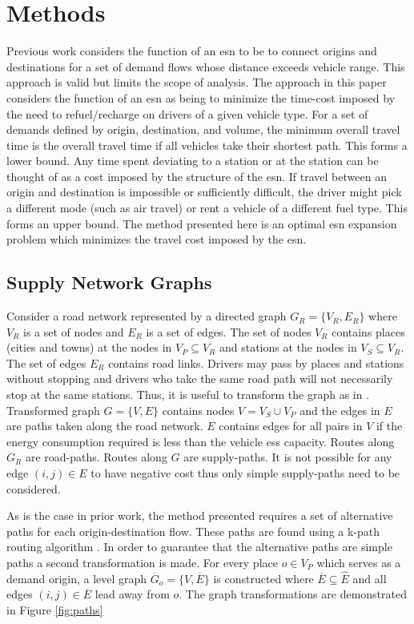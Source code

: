 \section{Methods}

Previous work considers the function of an \gls{esn} to be to connect origins and destinations for a set of demand flows whose distance exceeds vehicle range. This approach is valid but limits the scope of analysis. The approach in this paper considers the function of an \gls{esn} as being to minimize the time-cost imposed by the need to refuel/recharge on drivers of a given vehicle type. For a set of demands defined by origin, destination, and volume, the minimum overall travel time is the overall travel time if all vehicles take their shortest path. This forms a lower bound. Any time spent deviating to a station or at the station can be thought of as a cost imposed by the structure of the \gls{esn}. If travel between an origin and destination is impossible or sufficiently difficult, the driver might pick a different mode (such as air travel) or rent a vehicle of a different fuel type. This forms an upper bound. The method presented here is an optimal \gls{esn} expansion problem which minimizes the travel cost imposed by the \gls{esn}.

\subsection{Supply Network Graphs}

Consider a road network represented by a directed graph $G_R = \{V_R, E_R\}$ where $V_R$ is a set of nodes and $E_R$ is a set of edges. The set of nodes $V_R$ contains places (cities and towns) at the nodes in $V_{P} \subseteq V_R$ and stations at the nodes in $V_{S} \subseteq V_R$. The set of edges $E_R$ contains road links. Drivers may pass by places and stations without stopping and drivers who take the same road path will not necessarily stop at the same stations. Thus, it is useful to transform the graph as in \citep{MirHassani_2013}. Transformed graph $G = \{V, E\}$ contains nodes $V = V_S \cup V_P$ and the edges in $E$ are paths taken along the road network. $E$ contains edges for all pairs in $V$ if the energy consumption required is less than the vehicle \gls{ess} capacity.  Routes along $G_R$ are road-paths. Routes along $G$ are supply-paths. It is not possible for any edge $(i, j) \in E$ to have negative cost thus only simple supply-paths need to be considered.

As is the case in prior work, the method presented requires a set of alternative paths for each origin-destination flow. These paths are found using a k-path routing algorithm \citep{Yen_1971, Qian_2013, Eppstein_1998}. In order to guarantee that the alternative paths are simple paths a second transformation is made. For every place $o \in V_P$ which serves as a demand origin, a level graph $\overline{G}_o = \{V, \overline{E}\}$ is constructed where $\overline{E} \subseteq \hat{E}$ and all edges $(i, j) \in \overline{E}$ lead away from $o$. The graph transformations are demonstrated in Figure \ref{fig:paths}



